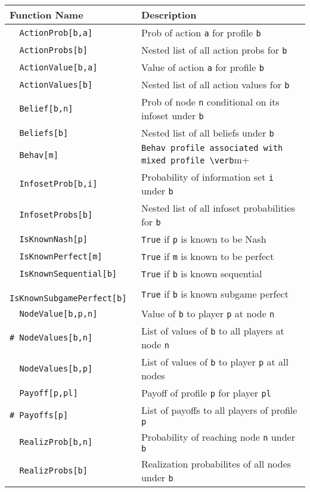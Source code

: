 \begin{table}[htp]
\begin{center}
\begin{tabular} {|l||l|} \hline
Function Name	& Description \\ 
\hline
\verb+  ActionProb[b,a]+ & Prob of action \verb+a+ for profile \verb+b+\\
\verb+  ActionProbs[b]+ & Nested list of all action probs for \verb+b+ \\ 
\verb+  ActionValue[b,a]+ & Value of action \verb+a+ for profile \verb+b+\\ 
\verb+  ActionValues[b]+ & Nested list of all action values for \verb+b+ \\ 
\verb+  Belief[b,n]+ & Prob of node \verb+n+ conditional on its
infoset under \verb+b+\\ 
\verb+  Beliefs[b]+ & Nested list of all beliefs under \verb+b+\\ 
\verb+  Behav[m]+ & \verb+Behav profile associated with mixed profile \verb+m+\\
\verb+  InfosetProb[b,i]+ & Probability of information set \verb+i+
under \verb+b+\\ 
\verb+  InfosetProbs[b]+ & Nested list of all infoset probabilities
for \verb+b+\\ 
\verb+  IsKnownNash[p]+ &\verb+True+ if \verb+p+ is known to be Nash\\
\verb+  IsKnownPerfect[m]+ &\verb+True+ if \verb+m+ is known to be perfect\\
\verb+  IsKnownSequential[b]+ &\verb+True+ if \verb+b+ is known sequential\\
\verb+  IsKnownSubgamePerfect[b]+ &  \verb+True+ if \verb+b+ is known subgame perfect\\ 
\verb+  NodeValue[b,p,n]+ & Value of \verb+b+ to player \verb+p+ at
node \verb+n+\\ 
\verb+# NodeValues[b,n]+ & List of values of \verb+b+ to all players at node \verb+n+\\
\verb+  NodeValues[b,p]+ & List of values of \verb+b+ to player \verb+p+ at all nodes\\
\verb+  Payoff[p,pl]+ & Payoff of profile \verb+p+ for player \verb+pl+\\
\verb+# Payoffs[p]+ & List of payoffs to all players of profile \verb+p+\\
\verb+  RealizProb[b,n]+ & Probability of reaching node \verb+n+ under \verb+b+\\
\verb+  RealizProbs[b]+ & Realization probabilites of all nodes under \verb+b+\\ 

\end{tabular}
\end{center}
\end{table}
